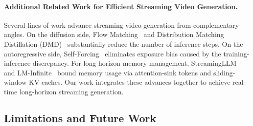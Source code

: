 \paragraph{Additional Related Work for Efficient Streaming Video Generation. }
Several lines of work advance streaming video generation from complementary angles.
On the diffusion side, Flow Matching~\citep{lipman2022flow} and Distribution Matching Distillation (DMD)~\citep{yin2024one} substantially reduce the number of inference steps.
On the autoregressive side, Self-Forcing~\citep{chen2025selfforcing} eliminates exposure bias caused by the training-inference discrepancy.
For long-horizon memory management, StreamingLLM~\citep{xiao2023streamingllm} and LM-Infinite~\citep{han2023lminfinite} bound memory usage via attention-sink tokens and sliding-window KV caches.
Our work integrates these advances together to achieve real-time long-horizon streaming generation.

\subsection{Limitations and Future Work}
\label{app:limitations}

